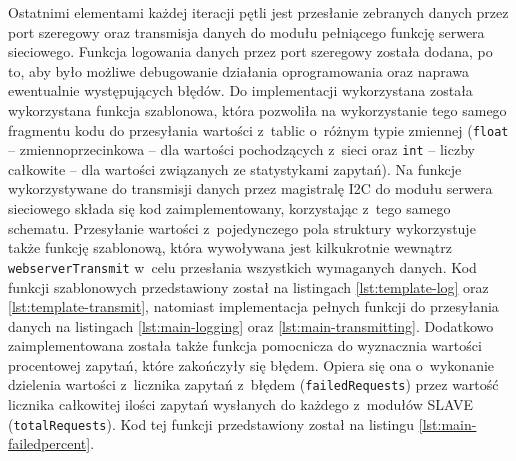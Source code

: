 Ostatnimi elementami każdej iteracji pętli jest przesłanie zebranych danych przez port szeregowy oraz transmisja danych
do modułu pełniącego funkcję serwera sieciowego. Funkcja logowania danych przez port szeregowy została dodana, po to,
aby było możliwe debugowanie działania oprogramowania oraz naprawa ewentualnie występujących błędów. Do implementacji
wykorzystana została wykorzystana funkcja szablonowa, która pozwoliła na wykorzystanie tego samego fragmentu kodu do
przesyłania wartości z~tablic o~różnym typie zmiennej (\texttt{float} -- zmiennoprzecinkowa -- dla wartości pochodzących
z~sieci oraz \texttt{int} -- liczby całkowite -- dla wartości związanych ze statystykami zapytań). Na funkcje
wykorzystywane do transmisji danych przez magistralę I2C do modułu serwera sieciowego składa się kod zaimplementowany,
korzystając z~tego samego schematu. Przesyłanie wartości z~pojedynczego pola struktury wykorzystuje także funkcję
szablonową, która wywoływana jest kilkukrotnie wewnątrz \texttt{webserverTransmit} w~celu przesłania wszystkich
wymaganych danych. Kod funkcji szablonowych przedstawiony został na listingach \ref{lst:template-log} oraz
\ref{lst:template-transmit}, natomiast implementacja pełnych funkcji do przesyłania danych na listingach
\ref{lst:main-logging} oraz \ref{lst:main-transmitting}. Dodatkowo zaimplementowana została także funkcja pomocnicza do
wyznacznia wartości procentowej zapytań, które zakończyły się błędem. Opiera się ona o~wykonanie dzielenia wartości
z~licznika zapytań z~błędem (\texttt{failedRequests}) przez wartość licznika całkowitej ilości zapytań wysłanych do
każdego z~modułów SLAVE (\texttt{totalRequests}). Kod tej funkcji przedstawiony został na listingu
\ref{lst:main-failedpercent}.









